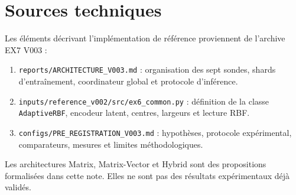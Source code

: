 \documentclass[11pt,a4paper]{article}
\begin{document}
\section*{Sources techniques}

Les éléments décrivant l'implémentation de référence
proviennent de l'archive EX7 V003 :

\begin{enumerate}
  \item \texttt{reports/ARCHITECTURE\_V003.md} :
  organisation des sept sondes, shards d'entraînement,
  coordinateur global et protocole d'inférence.

  \item \texttt{inputs/reference\_v002/src/ex6\_common.py} :
  définition de la classe \texttt{AdaptiveRBF},
  encodeur latent, centres, largeurs et lecture RBF.

  \item \texttt{configs/PRE\_REGISTRATION\_V003.md} :
  hypothèses, protocole expérimental, comparateurs,
  mesures et limites méthodologiques.
\end{enumerate}

Les architectures Matrix, Matrix-Vector et Hybrid sont
des propositions formalisées dans cette note. Elles ne
sont pas des résultats expérimentaux déjà validés.
\end{document}

